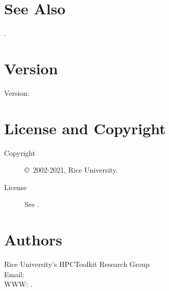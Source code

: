 \documentclass[english]{article}
\begin{document}
\section{See Also}

.

\section{Version}

Version: \Version

\section{License and Copyright}

\begin{description}
\item[Copyright] \copyright\ 2002-2021, Rice University.
\item[License] See .
\end{description}

\section{Authors}

\noindent
Rice University's HPCToolkit Research Group \\
Email:  \\
WWW: .

\LatexManEnd
\end{document}
